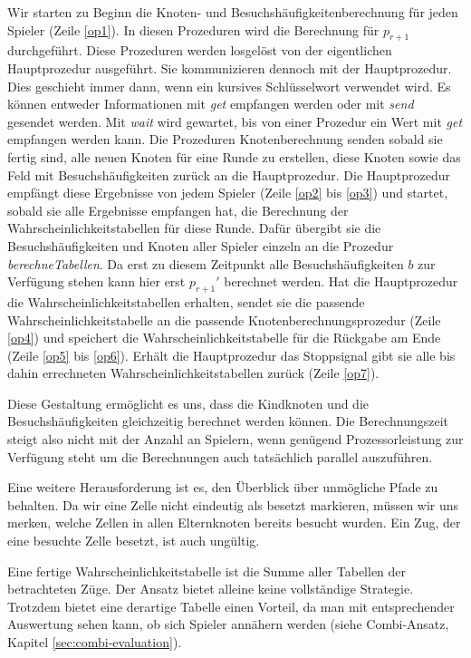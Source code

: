 \documentclass[12pt,a4paper]{article}
\begin{document}
Wir starten zu Beginn die Knoten- und Besuchshäufigkeitenberechnung für jeden Spieler (Zeile \ref{op1}). In diesen Prozeduren wird die Berechnung für $p_{r+1}$ durchgeführt. Diese Prozeduren werden losgelöst von der eigentlichen Hauptprozedur ausgeführt. Sie kommunizieren dennoch mit der Hauptprozedur. Dies geschieht immer dann, wenn ein kursives Schlüsselwort verwendet wird. Es können entweder Informationen mit \textit{get} empfangen werden oder mit \textit{send} gesendet werden. Mit \textit{wait} wird gewartet, bis von einer Prozedur ein Wert mit \textit{get} empfangen werden kann. Die Prozeduren Knotenberechnung senden sobald sie fertig sind, alle neuen Knoten für eine Runde zu erstellen, diese Knoten sowie das Feld mit Besuchshäufigkeiten zurück an die Hauptprozedur. Die Hauptprozedur empfängt diese Ergebnisse von jedem Spieler (Zeile \ref{op2} bis \ref{op3}) und startet, sobald sie alle Ergebnisse empfangen hat, die Berechnung der Wahrscheinlichkeitstabellen für diese Runde. Dafür übergibt sie die Besuchshäufigkeiten und Knoten aller Spieler einzeln an die Prozedur \textit{berechneTabellen}. Da erst zu diesem Zeitpunkt alle Besuchshäufigkeiten $b$ zur Verfügung stehen kann hier erst ${p_{r+1}}'$ berechnet werden. Hat die Hauptprozedur die Wahrscheinlichkeitstabellen erhalten, sendet sie die passende Wahrscheinlichkeitstabelle an die passende Knotenberechnungsprozedur (Zeile \ref{op4}) und speichert die Wahrscheinlichkeitstabelle für die Rückgabe am Ende (Zeile \ref{op5} bis \ref{op6}). Erhält die Hauptprozedur das Stoppsignal gibt sie alle bis dahin errechneten Wahrscheinlichkeitstabellen zurück (Zeile \ref{op7}).

Diese Gestaltung ermöglicht es uns, dass die Kindknoten und die Besuchshäufigkeiten gleichzeitig berechnet werden können. Die Berechnungszeit steigt also nicht mit der Anzahl an Spielern, wenn genügend Prozessorleistung zur Verfügung steht um die Berechnungen auch tatsächlich parallel auszuführen.

Eine weitere Herausforderung ist es, den Überblick über unmögliche Pfade zu behalten. Da wir eine Zelle nicht eindeutig als besetzt markieren, müssen wir uns merken, welche Zellen in allen Elternknoten bereits besucht wurden. Ein Zug, der eine besuchte Zelle besetzt, ist auch ungültig.

Eine fertige Wahrscheinlichkeitstabelle ist die Summe aller Tabellen der betrachteten Züge. Der Ansatz bietet alleine keine vollständige Strategie. Trotzdem bietet eine derartige Tabelle einen Vorteil, da man mit entsprechender Auswertung sehen kann, ob sich Spieler annähern werden (siehe Combi-Ansatz, Kapitel \ref{sec:combi-evaluation}).
\end{document}
